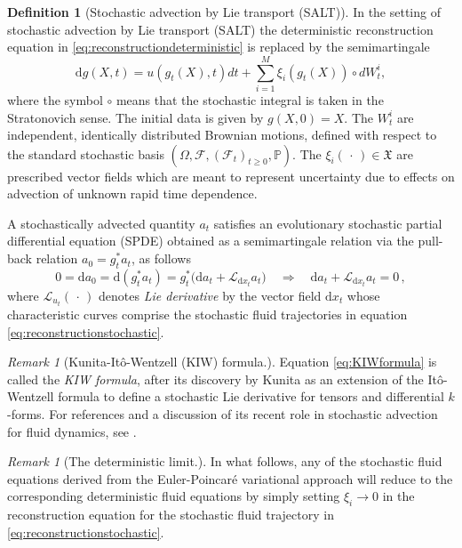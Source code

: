 \documentclass[11pt, oneside]{article}   	%
\numberwithin{equation}{section}
\theoremstyle{plain}
\theoremstyle{definition}
\newtheorem{definition}[theorem]{Definition}
\theoremstyle{remark}
\newtheorem{remark}[theorem]{Remark}
\newcommand{\<}{\langle}
\renewcommand{\>}{\rangle}
\def\rmd{{\mathrm{d}}}
\begin{document}
\begin{definition}[Stochastic advection by Lie transport (SALT)\cite{Holm2015}]
In the setting of stochastic advection by Lie transport (SALT) the deterministic reconstruction equation in \eqref{eq:reconstructiondeterministic} is replaced by the semimartingale
\begin{equation}
{\rmd}g(X,t) = u(g_t(X),t)dt + \sum_{i=1}^M \xi_i(g_t(X))\circ dW_t^i,
\label{eq:reconstructionstochastic}
\end{equation}
where the symbol $\circ$ means that the stochastic integral is taken in the Stratonovich sense. The initial data is given by $g(X,0)=X$. The $W_t^i$ are independent, identically distributed Brownian motions, defined with respect to the standard stochastic basis $(\Omega,\mathcal{F},(\mathcal{F}_t)_{t\geq 0},\mathbb{P})$. The $\xi_i(\,\cdot\,)\in\mathfrak{X}$ are prescribed vector fields which are meant to represent uncertainty due to effects on advection of unknown rapid time dependence.

A stochastically advected quantity $a_t$ satisfies an evolutionary stochastic partial differential equation (SPDE) obtained as a  semimartingale relation via the pull-back relation $a_0 = g_t^*a_t$, as follows
\begin{equation}
0 = {\rmd} a_0 = {\rmd}(g_t^*a_t )= g_t^*\big({\rmd} a_t + \mathcal{L}_{{\rmd}x_t} a_t\big)
\quad\Longrightarrow\quad {\rmd} a_t + \mathcal{L}_{{\rmd}x_t} a_t = 0 \,,
\label{eq:KIWformula}
\end{equation}
where $\mathcal{L}_{u_t} (\,\cdot\,)$ denotes \emph{Lie derivative} by the vector field ${\rmd}x_t$ whose characteristic curves comprise the stochastic fluid trajectories in equation \eqref{eq:reconstructionstochastic}.  
\end{definition}
 

\begin{remark}[Kunita-It\^o-Wentzell (KIW) formula.]
Equation \eqref{eq:KIWformula} is called the \emph{KIW formula}, after its discovery by Kunita as an extension of the It\^o-Wentzell formula to define a stochastic Lie derivative for tensors and differential $k$-forms. For references and a discussion of its recent role in stochastic advection for fluid dynamics, see \cite{de2024geometric}.
\end{remark}

\begin{remark}[The deterministic limit.]
In what follows, any of the stochastic fluid equations derived from the Euler-Poincar\'e variational approach will reduce to the corresponding deterministic fluid equations by simply setting $\xi_i\to0$ in the reconstruction equation for the stochastic fluid trajectory in \eqref{eq:reconstructionstochastic}. 
\end{remark}
\end{document}
